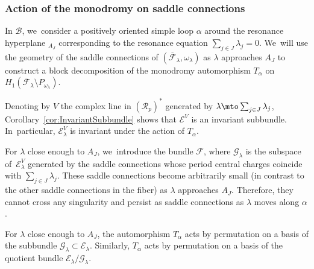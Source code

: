 \subsubsection{Action of the monodromy on saddle connections}

In $\mathcal{B}$, we~consider a positively oriented simple loop $\alpha$ around the resonance hyperplane $_{A_{J}}$ corresponding to the resonance equation $\sum_{j \in J} \lambda_{j} =0$. We~will use the geometry of the saddle connections of $(\overline{\mathcal{F}}_{\lambda},\omega_{\lambda})$ as $\lambda$ approaches $A_{J}$ to construct a block decomposition of the monodromy automorphism $T_{\alpha}$ on $H_{1}(\overline{\mathcal{F}}_{\lambda} \setminus P_{\omega_{\lambda}})$.

Denoting by $V$ the complex line in $(\mathcal{R}_{p})^{\ast}$ generated by $\lambda \mto \sum_{j \in J} \lambda_{j}$, Corollary~\ref{cor:InvariantSubbundle} shows that $\mathcal{E}^{V}$ is an invariant subbundle. In~particular, $\mathcal{E}_{\lambda}^{V}$ is invariant under the action of $T_{\alpha}$.

For $\lambda$ close enough to $A_{J}$, we~introduce the bundle $\mathcal{F}$, where $\mathcal{G}_{\lambda}$ is the subspace of~$\mathcal{E}_{\lambda}^{V}$ generated by the saddle connections whose period central charges coincide with $\sum_{j \in J} \lambda_{j}$. These saddle connections become arbitrarily small (in contrast to the other saddle connections in the fiber) as $\lambda$ approaches $A_{J}$. Therefore, they cannot cross any singularity and persist as saddle connections as $\lambda$ moves along $\alpha$.

\begin{prop}\label{prop:MonoSC}
For $\lambda$ close enough to $A_{J}$, the automorphism $T_{\alpha}$ acts by permutation on a basis of the subbundle $\mathcal{G}_{\lambda} \subset \mathcal{E}_{\lambda}$. Similarly, $T_{\alpha}$ acts by permutation on a basis of the quotient bundle $\mathcal{E}_{\lambda}/\mathcal{G}_{\lambda}$.
\end{prop}

